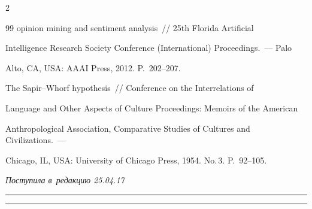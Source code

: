 \begin{multicols}{2}
{{\begin{thebibliography}{99}
opinion mining and sentiment analysis~// 25th  Florida Artificial 

Intelligence Research Society Conference (International) Proceedings.~--- Palo 

Alto, CA, USA: AAAI Press, 2012. P.~202--207.


 The Sapir--Whorf hypothesis~// Conference on the Interrelations of 

Language and Other Aspects of Culture Proceedings: Memoirs of the American 

Anthropological Association, Comparative Studies of Cultures and Civilizations.~--- 

Chicago, IL, USA: University of Chicago Press, 1954. No.\,3. P.~92--105.

 \end{thebibliography}



 }

 }



\end{multicols}



\vspace*{-3pt}



\hfill{\small\textit{Поступила в~редакцию 25.04.17}}



\vspace*{8pt}









\hrule



\vspace*{2pt}



\hrule








\def\tit{PSYCHOLINGUISTIC ANALYSIS OF~TEXT MESSAGES IN~RUSSIAN 

BASED ON~THEIR PHONOSEMANTIC STATISTICAL 

CHARACTERISTICS}



